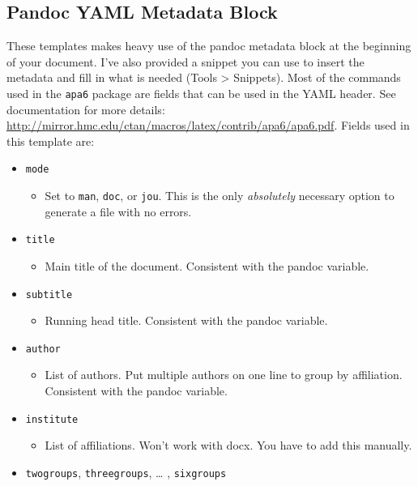 \documentclass[,longtable]{apa6}
\let\tightlist\relax %
\begin{document}
\hypertarget{pandoc-yaml-metadata-block}{%
\subsection{Pandoc YAML Metadata
Block}\label{pandoc-yaml-metadata-block}}

These templates makes heavy use of the pandoc metadata block at the
beginning of your document. I've also provided a snippet you can use to
insert the metadata and fill in what is needed (Tools \textgreater{}
Snippets). Most of the commands used in the \texttt{apa6} package are
fields that can be used in the YAML header. See documentation for more
details:
\url{http://mirror.hmc.edu/ctan/macros/latex/contrib/apa6/apa6.pdf}.
Fields used in this template are:

\begin{itemize}
\tightlist
\item
  \texttt{mode}

  \begin{itemize}
  \tightlist
  \item
    Set to \texttt{man}, \texttt{doc}, or \texttt{jou}. This is the only
    \emph{absolutely} necessary option to generate a file with no
    errors.
  \end{itemize}
\item
  \texttt{title}

  \begin{itemize}
  \tightlist
  \item
    Main title of the document. Consistent with the pandoc variable.
  \end{itemize}
\item
  \texttt{subtitle}

  \begin{itemize}
  \tightlist
  \item
    Running head title. Consistent with the pandoc variable.
  \end{itemize}
\item
  \texttt{author}

  \begin{itemize}
  \tightlist
  \item
    List of authors. Put multiple authors on one line to group by
    affiliation. Consistent with the pandoc variable.
  \end{itemize}
\item
  \texttt{institute}

  \begin{itemize}
  \tightlist
  \item
    List of affiliations. Won't work with docx. You have to add this
    manually.
  \end{itemize}
\item
  \texttt{twogroups}, \texttt{threegroups}, \ldots{} ,
  \texttt{sixgroups}


\end{itemize}
\end{document}
